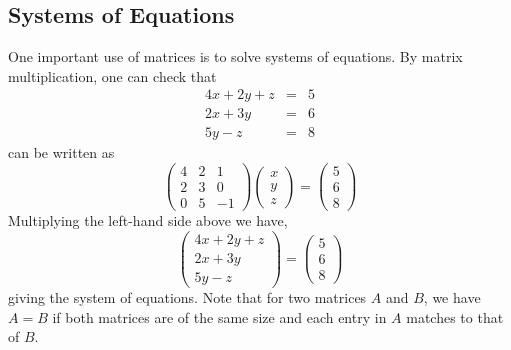\documentclass{ximera}
\begin{document}
\subsection{Systems of Equations}
One important use of matrices is to solve systems of equations. By matrix multiplication, one can check that
\begin{eqnarray*}
4x+2y+z &=& 5\\
2x+3y &=& 6\\
5y -z &=& 8
\end{eqnarray*}
can be written as
\[
\left(\begin{array}{ccc}
4 & 2 & 1 \\
2 & 3 & 0\\
0 & 5 & -1
\end{array}\right) \begin{pmatrix}
x \\
y\\
z
\end{pmatrix}
= \begin{pmatrix}
5 \\
6\\
8
\end{pmatrix}
\]
Multiplying the left-hand side above we have,
\[
\begin{pmatrix}
4x+2y+z\\
2x+3y\\
5y-z
\end{pmatrix} = \begin{pmatrix}
5\\
6\\
8
\end{pmatrix}
\]
giving the system of equations. Note that for two matrices $A$ and $B$, we have $A=B$ if both matrices are of the same size and each entry in $A$ matches to that of $B$.
\end{document}
